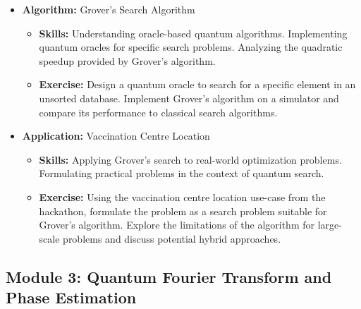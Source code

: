 \begin{itemize}
    \item \textbf{Algorithm:} Grover's Search Algorithm
    \begin{itemize}
        \item \textbf{Skills:} Understanding oracle-based quantum algorithms. Implementing quantum oracles for specific search problems. Analyzing the quadratic speedup provided by Grover's algorithm.
        \item \textbf{Exercise:} Design a quantum oracle to search for a specific element in an unsorted database. Implement Grover's algorithm on a simulator and compare its performance to classical search algorithms.
    \end{itemize}
    
    \item \textbf{Application:} Vaccination Centre Location
    \begin{itemize}
        \item \textbf{Skills:} Applying Grover's search to real-world optimization problems. Formulating practical problems in the context of quantum search.
        \item \textbf{Exercise:} Using the vaccination centre location use-case from the hackathon, formulate the problem as a search problem suitable for Grover's algorithm. Explore the limitations of the algorithm for large-scale problems and discuss potential hybrid approaches.
    \end{itemize}
\end{itemize}

\subsection{Module 3: Quantum Fourier Transform and Phase Estimation}

